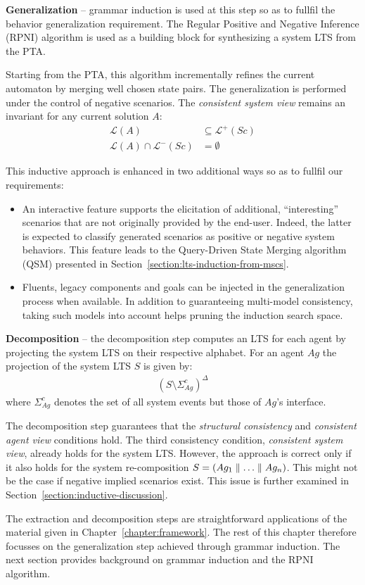 \noindent \textbf{Generalization} -- grammar induction is used at this step so as to fullfil the behavior generalization requirement. The Regular Positive and Negative Inference (RPNI) algorithm is used as a building block \cite{Oncina:1992} for synthesizing a system LTS from the PTA.

Starting from the PTA, this algorithm incrementally refines the current automaton by merging well chosen state pairs. The generalization is performed under the control of negative scenarios. The \emph{consistent system view} remains an invariant for any current solution $A$:
\begin{align*}
\mathcal{L}(A) &\subseteq \mathcal{L}^+(Sc)\\
\mathcal{L}(A) \cap \mathcal{L}^-(Sc) &= \emptyset
\end{align*}

This inductive approach is enhanced in two additional ways so as to fullfil our requirements:

\begin{itemize}

\item An interactive feature supports the elicitation of additional, ``interesting'' scenarios that are not originally provided by the end-user. Indeed, the latter is expected to classify generated scenarios as positive or negative system behaviors.  This feature leads to the Query-Driven State Merging algorithm (QSM) presented in Section~\ref{section:lts-induction-from-mscs}.

\item Fluents, legacy components and goals can be injected in the generalization process when available. In addition to guaranteeing multi-model consistency, taking such models into account helps pruning the induction search space.

\end{itemize}

\noindent \textbf{Decomposition} -- the decomposition step computes an LTS for each agent by projecting the system LTS on their respective alphabet. For an agent $Ag$ the projection of the system LTS $S$ is given by:
\begin{align}
(S \setminus \Sigma_{Ag}^c)^\Delta
\end{align}
\noindent where $\Sigma_{Ag}^c$ denotes the set of all system events but those of $Ag$'s interface.

The decomposition step guarantees that the \emph{structural consistency} and \emph{consistent agent view} conditions hold. The third consistency condition, \emph{consistent system view}, already holds for the system LTS. However, the approach is correct only if it also holds for the system re-composition $S = (Ag_1 \parallel \ldots \parallel Ag_n)$. This might not be the case if negative implied scenarios exist. This issue is further examined in Section~\ref{section:inductive-discussion}.

The extraction and decomposition steps are straightforward applications of the material given in Chapter~\ref{chapter:framework}. The rest of this chapter therefore focusses on the generalization step achieved through grammar induction. The next section provides background on grammar induction and the RPNI algorithm.
